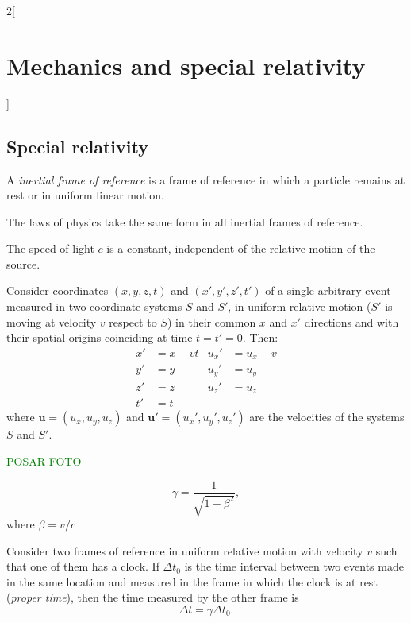 \documentclass[../../../main.tex]{subfiles}
\begin{document}
\begin{multicols}{2}[\section{Mechanics and special relativity}]
\subsection{Special relativity}
\begin{definition}
A \textit{inertial frame of reference} is a frame of reference in which a particle remains at rest or in uniform linear motion.
\end{definition}
\begin{concept}
The laws of physics take the same form in all inertial frames of reference.
\end{concept}
\begin{concept}
The speed of light $c$ is a constant, independent of the relative motion of the source.
\end{concept}
\begin{concept}
Consider coordinates $(x,y,z,t)$ and $(x',y',z',t')$ of a single arbitrary event measured in two coordinate systems $S$ and $S'$, in uniform relative motion ($S'$ is moving at velocity $v$ respect to $S$) in their common $x$ and $x'$ directions and  with their spatial origins coinciding at time $t=t'=0$. Then:
\begin{align*}
    x'&=x-vt & u_x'&=u_x-v\\
    y'&=y & u_y'&=u_y\\
    z'&=z & u_z'&=u_z\\
    t'&=t & &
\end{align*}
where $\boldsymbol{u}=(u_x,u_y,u_z)$ and $\boldsymbol{u'}=(u_x',u_y',u_z')$ are the velocities of the systems $S$ and $S'$.
\end{concept}
\textcolor{green}{POSAR FOTO}%
\begin{concept}
$$\gamma=\frac{1}{\sqrt{1-\beta^2}},$$ where $\beta=v/c$
\end{concept}
\begin{concept}
Consider two frames of reference in uniform relative motion with velocity $v$ such that one of them has a clock. If $\Delta t_0$ is the time interval between two events made in the same location and measured in the frame in which the clock is at rest (\textit{proper time}), then the time measured by the other frame is
$$\Delta t=\gamma\Delta t_0.$$
\end{concept}
\begin{concept}

\end{concept}
\end{multicols}
\end{document}
